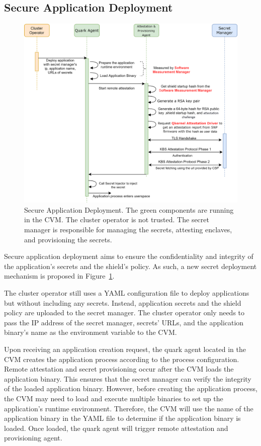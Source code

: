 \subsection{Secure Application Deployment}
\label{sec:secure_application_deployment}
\begin{figure}[!htb]
    \centering
    \includegraphics[height=0.5\textheight]{images/attestation_provisioning.png}
    \caption[Secure Application Deployment Workflow]{Secure Application Deployment. The green components are running in the \acrshort{CVM}. The cluster operator is not trusted. The secret manager is responsible for managing the secrets, attesting enclaves, and provisioning the secrets.}
    \label{fig:attestation_provisioning}
\end{figure}
Secure application deployment aims to ensure the confidentiality and integrity of the application’s secrets and the shield’s policy. As such, a new secret deployment mechanism is proposed in Figure~\ref{fig:attestation_provisioning}.

The cluster operator still uses a YAML configuration file to deploy applications but without including any secrets. Instead, application secrets and the shield policy are uploaded to the secret manager. The cluster operator only needs to pass the IP address of the secret manager, secrets’ URLs, and the application binary’s name as the environment variable 
to the \acrshort{CVM}. 

Upon receiving an application creation request, the quark agent located in the \acrshort{CVM} creates the application process according to the process configuration. Remote attestation and secret provisioning occur after the CVM loads the application binary. This ensures that the secret manager can verify the integrity of the loaded application binary. 
However, before creating the application process, the \acrshort{CVM} may need to load and execute multiple binaries to set up the application’s runtime environment. Therefore, the \acrshort{CVM} will use the name of the application binary in the YAML file to determine if the application binary is loaded. Once loaded, the quark agent will trigger remote attestation 
and provisioning agent.

